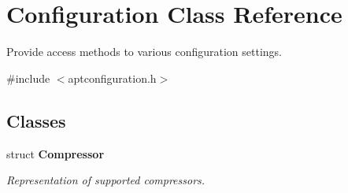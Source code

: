 \section{\-Configuration \-Class \-Reference}
\label{classAPT_1_1Configuration}


\-Provide access methods to various configuration settings.  




{\ttfamily \#include $<$aptconfiguration.\-h$>$}

\subsection*{\-Classes}
\begin{DoxyCompactItemize}
\item 
struct {\bf \-Compressor}
\begin{DoxyCompactList}\small\item\em \-Representation of supported compressors. \end{DoxyCompactList}\end{DoxyCompactItemize}
